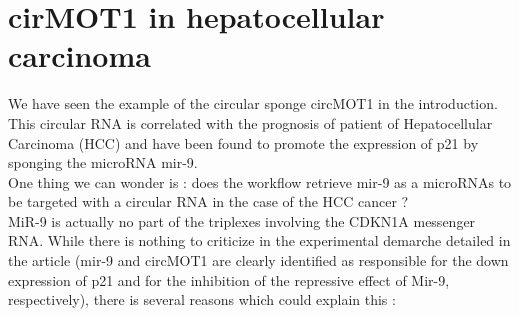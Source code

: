 \documentclass[a4paper,12pt]{report}
\begin{document}
\section{cirMOT1 in hepatocellular carcinoma}

We have seen the example of the circular sponge circMOT1 in the introduction. This circular RNA is correlated with the prognosis of patient of Hepatocellular Carcinoma (HCC) and have been found to promote the expression of p21 by sponging the microRNA mir-9.\\

One thing we can wonder is : does the workflow retrieve mir-9 as a microRNAs to be targeted with a circular RNA in the case of the HCC cancer ?\\

MiR-9 is actually no part of the triplexes involving the CDKN1A messenger RNA. While there is nothing to criticize in the experimental demarche detailed in the article (mir-9 and circMOT1 are clearly identified as responsible for the down expression of p21 and for the inhibition of the repressive effect of Mir-9, respectively), there is several reasons which could explain this :
\end{document}
